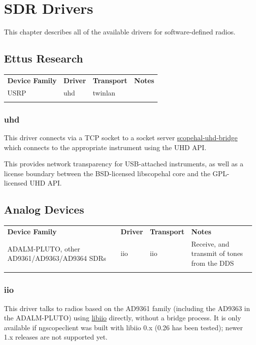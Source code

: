 \chapter{SDR Drivers}
\label{sec:sdr-drivers}

This chapter describes all of the available drivers for software-defined radios.

\section{Ettus Research}

\begin{tabularx}{16cm}{lllX}
\thickhline
\textbf{Device Family} & \textbf{Driver} & \textbf{Transport} & \textbf{Notes} \\
\thickhline
USRP & uhd & twinlan & \\
\thickhline
\end{tabularx}

\subsection{uhd}

This driver connects via a TCP socket to a socket server
\href{https://github.com/ngscopeclient/scopehal-uhd-bridge}{scopehal-uhd-bridge} which connects to the appropriate
instrument using the UHD API.

This provides network transparency for USB-attached instruments, as well as a license boundary between the BSD-licensed
libscopehal core and the GPL-licensed UHD API.

\section{Analog Devices}

\begin{tabularx}{16cm}{lllX}
\thickhline
\textbf{Device Family} & \textbf{Driver} & \textbf{Transport} & \textbf{Notes} \\
\thickhline
ADALM-PLUTO, other AD9361/AD9363/AD9364 SDRs & iio & iio & Receive, and transmit of tones from the DDS \\
\thickhline
\end{tabularx}

\subsection{iio}

This driver talks to radios based on the AD9361 family (including the AD9363 in the ADALM-PLUTO) using
\href{https://github.com/analogdevicesinc/libiio}{libiio} directly, without a bridge process. It is only available
if ngscopeclient was built with libiio 0.x (0.26 has been tested); newer 1.x releases are not supported yet.


